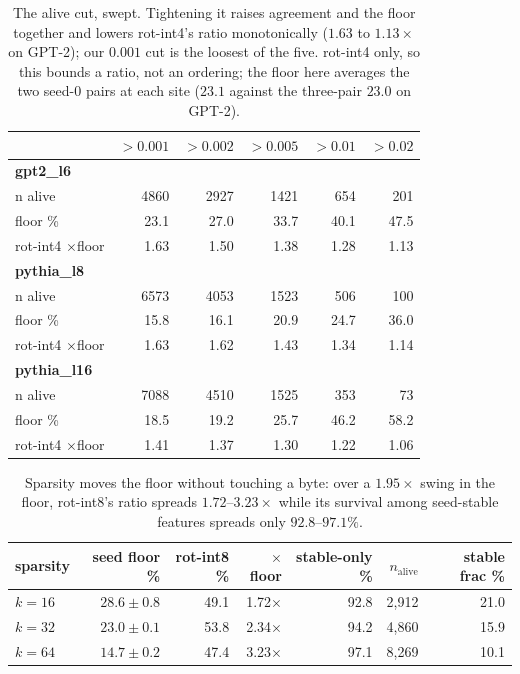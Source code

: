 \begin{table}[htbp]
\caption{The alive cut, swept. Tightening it raises agreement and the floor together and lowers rot-int4's ratio monotonically ($1.63$ to $1.13\times$ on GPT-2); our $0.001$ cut is the loosest of the five. rot-int4 only, so this bounds a ratio, not an ordering; the floor here averages the two seed-0 pairs at each site ($23.1$ against the three-pair $23.0$ on GPT-2).}
\label{tab:firingrate}
\centering\small
\begin{tabular}{lrrrrr}
\toprule
 & $>0.001$ & $>0.002$ & $>0.005$ & $>0.01$ & $>0.02$ \\
\midrule
\textbf{gpt2\_l6} &  &  &  &  &  \\
n alive & 4860 & 2927 & 1421 & 654 & 201 \\
floor \% & 23.1 & 27.0 & 33.7 & 40.1 & 47.5 \\
rot-int4 $\times$floor & 1.63 & 1.50 & 1.38 & 1.28 & 1.13 \\
\midrule
\textbf{pythia\_l8} &  &  &  &  &  \\
n alive & 6573 & 4053 & 1523 & 506 & 100 \\
floor \% & 15.8 & 16.1 & 20.9 & 24.7 & 36.0 \\
rot-int4 $\times$floor & 1.63 & 1.62 & 1.43 & 1.34 & 1.14 \\
\midrule
\textbf{pythia\_l16} &  &  &  &  &  \\
n alive & 7088 & 4510 & 1525 & 353 & 73 \\
floor \% & 18.5 & 19.2 & 25.7 & 46.2 & 58.2 \\
rot-int4 $\times$floor & 1.41 & 1.37 & 1.30 & 1.22 & 1.06 \\
\bottomrule
\end{tabular}
\end{table}

\begin{table}[htbp]
\caption{Sparsity moves the floor without touching a byte: over a $1.95\times$ swing in the floor, rot-int8's ratio spreads $1.72$--$3.23\times$ while its survival among seed-stable features spreads only $92.8$--$97.1\%$.}
\label{tab:sparsity}
\centering\small
\begin{tabular}{lrrrrrr}
\toprule
sparsity & seed floor \% & rot-int8 \% & $\times$floor & stable-only \% & $n_{\text{alive}}$ & stable frac \% \\
\midrule
$k=16$ & $28.6 \pm 0.8$ & 49.1 & 1.72$\times$ & 92.8 & 2,912 & 21.0 \\
$k=32$ & $23.0 \pm 0.1$ & 53.8 & 2.34$\times$ & 94.2 & 4,860 & 15.9 \\
$k=64$ & $14.7 \pm 0.2$ & 47.4 & 3.23$\times$ & 97.1 & 8,269 & 10.1 \\
\bottomrule
\end{tabular}
\end{table}

